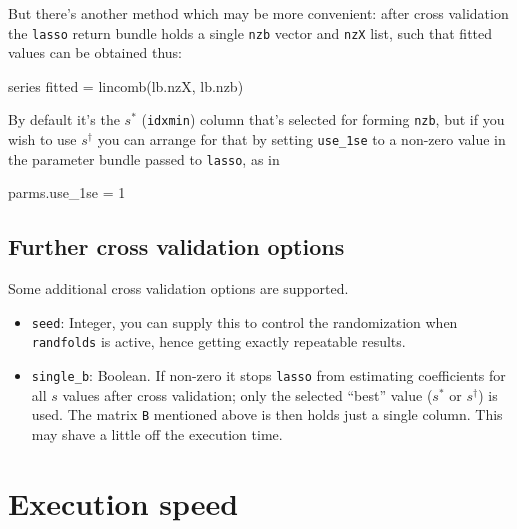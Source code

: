 \documentclass{article}
\begin{document}
But there's another method which may be more convenient: after cross
validation the \texttt{lasso} return bundle holds a single
\texttt{nzb} vector and \texttt{nzX} list, such that fitted values can
be obtained thus:
\begin{code}
series fitted = lincomb(lb.nzX, lb.nzb)
\end{code}
By default it's the $s^*$ (\texttt{idxmin}) column that's selected for
forming \texttt{nzb}, but if you wish to use $s^{\dagger}$ you can
arrange for that by setting \texttt{use\_1se} to a non-zero value in
the parameter bundle passed to \texttt{lasso}, as in
\begin{code}
parms.use_1se = 1
\end{code}

\subsection*{Further cross validation options}

Some additional cross validation options are supported.

\begin{itemize}
\item \texttt{seed}: Integer, you can supply this to control the
  randomization when \texttt{randfolds} is active, hence getting
  exactly repeatable results.
\item \texttt{single\_b}: Boolean. If non-zero it stops \texttt{lasso}
  from estimating coefficients for all $s$ values after cross
  validation; only the selected ``best'' value ($s^*$ or
  $s^{\dagger}$) is used. The matrix \texttt{B} mentioned above is
  then holds just a single column. This may shave a little off the
  execution time.

\end{itemize}

\section{Execution speed}
\label{sec:speed}
\end{document}

